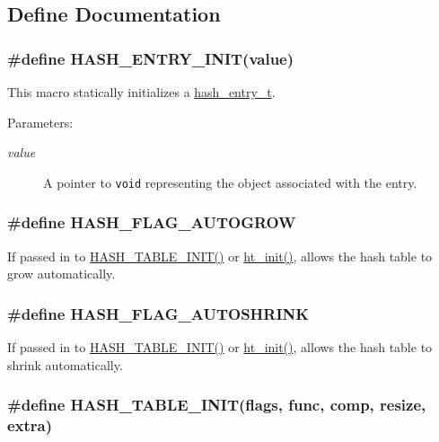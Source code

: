 \subsection{Define Documentation}
\hypertarget{group__dbprim__hash_a29}{
\subsubsection[HASH\_\-ENTRY\_\-INIT]{\setlength{\rightskip}{0pt plus 5cm}\#define HASH\_\-ENTRY\_\-INIT(value)}}
\label{group__dbprim__hash_a29}


This macro statically initializes a \hyperlink{group__dbprim__hash_a1}{hash\_\-entry\_\-t}.

\begin{Desc}
\item[Parameters:]
\begin{description}
\item[{\em value}]A pointer to {\tt void} representing the object associated with the entry. \end{description}
\end{Desc}
\hypertarget{group__dbprim__hash_a16}{
\subsubsection[HASH\_\-FLAG\_\-AUTOGROW]{\setlength{\rightskip}{0pt plus 5cm}\#define HASH\_\-FLAG\_\-AUTOGROW}}
\label{group__dbprim__hash_a16}


If passed in to \hyperlink{group__dbprim__hash_a18}{HASH\_\-TABLE\_\-INIT()} or \hyperlink{group__dbprim__hash_a6}{ht\_\-init()}, allows the hash table to grow automatically. \hypertarget{group__dbprim__hash_a17}{
\subsubsection[HASH\_\-FLAG\_\-AUTOSHRINK]{\setlength{\rightskip}{0pt plus 5cm}\#define HASH\_\-FLAG\_\-AUTOSHRINK}}
\label{group__dbprim__hash_a17}


If passed in to \hyperlink{group__dbprim__hash_a18}{HASH\_\-TABLE\_\-INIT()} or \hyperlink{group__dbprim__hash_a6}{ht\_\-init()}, allows the hash table to shrink automatically. \hypertarget{group__dbprim__hash_a18}{
\subsubsection[HASH\_\-TABLE\_\-INIT]{\setlength{\rightskip}{0pt plus 5cm}\#define HASH\_\-TABLE\_\-INIT(flags, func, comp, resize, extra)}}
\label{group__dbprim__hash_a18}


